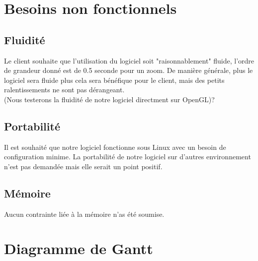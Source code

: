 \documentclass{article}
\begin{document}
\section{Besoins non fonctionnels}\label{non_func_need}

\subsection{Fluidité}\label{nfn_fluid}
  Le client souhaite que l'utilisation du logiciel soit "raisonnablement" fluide, l'ordre de grandeur donné est de 0.5 seconde pour un zoom. De manière générale, plus le logiciel sera fluide plus cela sera bénéfique pour le client, mais des petits ralentissements ne sont pas dérangeant.\\
(Nous testerons la fluidité de notre logiciel directment sur OpenGL)?

\subsection{Portabilité}\label{nfn_port}
 Il est souhaité que notre logiciel fonctionne sous Linux avec un besoin de configuration minime. La portabilité de notre logiciel sur d'autres environnement n'est pas demandée mais elle serait un point positif.

\subsection{Mémoire}\label{nfn_mem}
 Aucun contrainte liée à la mémoire n'as été soumise.

\section{Diagramme de Gantt}
    



\end{document}
